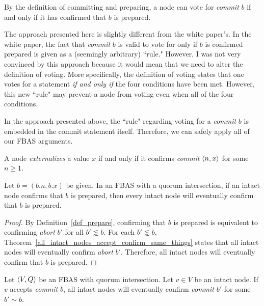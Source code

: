 \begin{rem}
    By the definition of committing and preparing, a node can vote for \textit{commit} $b$ if and only if it has confirmed that $b$ is prepared.
\end{rem}

\begin{rem}
    The approach presented here is slightly different from the white paper's.
    In the white paper, the fact that \textit{commit} $b$ is valid to vote for only if $b$ is confirmed prepared is given as a (seemingly arbitrary) ``rule."
    However, I was not very convinced by this approach because it would mean that we need to alter the definition of voting.
    More specifically, the definition of voting states that one votes for a statement \textit{if and only if} the four conditions have been met.  
    However, this new ``rule" may prevent a node from voting even when all of the four conditions.

    In the approach presented above, the ``rule" regarding voting for a \textit{commit} $b$ is embedded in the commit statement itself.
    Therefore, we can safely apply all of our FBAS arguments.
\end{rem}

\begin{defn}[Externalize]
    A node \textit{externalizes} a value $x$ if and only if it confirms \textit{commit} $\ev{n, x}$ for some $n \geq 1$.
\end{defn}

\begin{thm}
    Let $b = (b.n, b.x)$ be given.
    In an FBAS with a quorum intersection, if an intact node confirms that $b$ is prepared, then every intact node will eventually confirm that $b$ is prepared.
\end{thm}

\begin{proof}
    By Definition~\ref{def_prepare}, confirming that $b$ is prepared is equivalent to confirming \textit{abort} $b'$ for all  $b' \lnsim  b$.
    For each $b' \lnsim b$, Theorem~\ref{all_intact_nodes_accept_confirm_same_things} states that all intact nodes will eventually confirm \textit{abort} $b'$.
    Therefore, all intact nodes will eventually confirm that $b$ is prepared.
\end{proof}

\begin{thm}
    Let $\ev{V, Q}$ be an FBAS with quorum intersection.
    Let $v \in V$ be an intact node.
    If $v$ accepts \textit{commit} $b$, all intact nodes will eventually confirm \textit{commit} $b'$ for some $b' \sim b$.
\end{thm}

